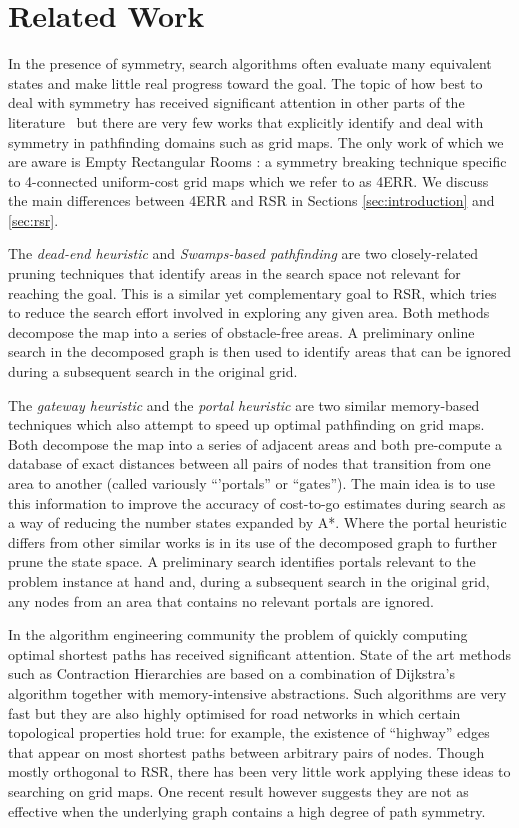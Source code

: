 \section{Related Work}
\label{sec:relatedwork}
In the presence of symmetry, search algorithms often
evaluate many equivalent states and make little real progress toward the goal.
The topic of how best to deal with symmetry has received significant attention
in other parts of the literature~\cite{rossi06} but there are very few works
that explicitly identify and deal with symmetry in pathfinding domains 
such as grid maps. The only work of which we are aware is Empty Rectangular Rooms
\cite{harabor10}: a symmetry breaking technique specific to 4-connected
uniform-cost grid maps which we refer to as 4ERR.  We discuss the main
differences between 4ERR and RSR in Sections \ref{sec:introduction} and
\ref{sec:rsr}.
\par
The \emph{dead-end heuristic} \cite{bjornsson06} and \emph{Swamps-based
pathfinding} \cite{pochter10} are two closely-related pruning techniques
that identify areas in the search space not relevant for reaching the goal. 
This is a similar yet complementary goal
to RSR, which tries to reduce the search effort involved in exploring any given
area. Both methods decompose the map into a
series of obstacle-free areas. A preliminary
online search in the decomposed graph is then used to identify areas that can 
be ignored during a subsequent search in the original grid.
\par
The \emph{gateway heuristic} \cite{bjornsson06} and the \emph{portal heuristic}
\cite{goldenberg10} are two similar memory-based techniques which also attempt
to speed up optimal pathfinding on grid maps.  
Both decompose the map into a series of adjacent areas and both
pre-compute a database of exact distances between all pairs of nodes that transition 
from one area to another (called variously ``'portals'' or ``gates'').  
The main idea is to use this information to improve the accuracy of cost-to-go estimates
during search as a way of reducing the number states expanded by A*. 
Where the portal heuristic differs from other similar works
\cite{bjornsson06,sturtevant09} is in its use of the decomposed
graph to further prune the state space. A preliminary search 
identifies portals relevant to the problem instance at hand and, during 
a subsequent search in the original grid, 
any nodes from an area that contains no relevant portals are ignored.
\par
In the algorithm engineering community the problem of quickly computing optimal
shortest paths has received significant attention.  State of the art methods
such as Contraction Hierarchies \cite{geisberger08}
are based on a combination of Dijkstra's algorithm together with
memory-intensive abstractions. 
Such algorithms are very fast but they are also highly optimised for road
networks in which certain topological properties hold true: for example, the
existence of ``highway'' edges that appear on most shortest paths between
arbitrary pairs of nodes.  Though mostly orthogonal to RSR, there has been very
little work applying these ideas to searching on grid maps. One recent result
however \cite{sturtevant10} suggests they are not as effective when the
underlying graph contains a high degree of path symmetry.
